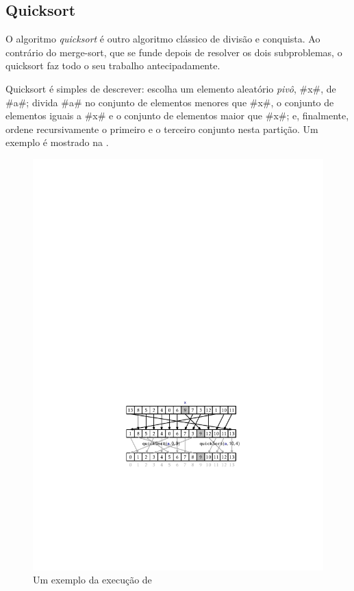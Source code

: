 \subsection{Quicksort}

%
O algoritmo \emph{quicksort} é outro algoritmo clássico de divisão e conquista. Ao contrário do merge-sort, que se funde depois de resolver os dois subproblemas, o quicksort faz todo o seu trabalho antecipadamente.

Quicksort é simples de descrever: escolha um elemento aleatório \emph{pivô}, 
% 
#x#, de #a#; divida #a# no conjunto de elementos menores que #x#, o conjunto de elementos iguais a #x# e o conjunto de elementos maior que #x#; e, finalmente, ordene recursivamente o primeiro e o terceiro conjunto nesta partição. Um exemplo é mostrado na .
\begin{figure}
  \begin{center}
    \includegraphics[scale=0.90909]{figs/quicksort}
    \caption[Quicksort]{Um exemplo da execução de }
  \end{center}
\end{figure}
